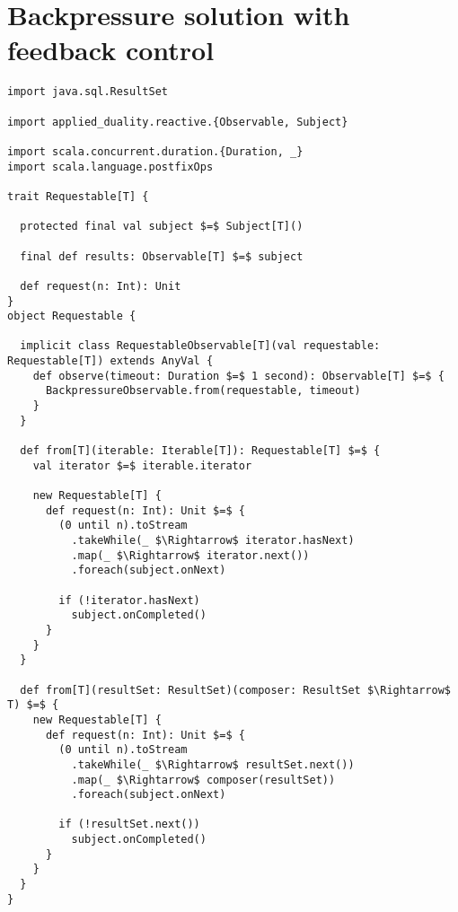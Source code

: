\chapter{Backpressure solution with feedback control}
\label{app:backpressure-solution}

\begin{lstlisting}[style=ScalaStyle, caption={Universal, interactive interface, \code{Requestable}, used in the feedback system}]
import java.sql.ResultSet

import applied_duality.reactive.{Observable, Subject}

import scala.concurrent.duration.{Duration, _}
import scala.language.postfixOps

trait Requestable[T] {

  protected final val subject $=$ Subject[T]()

  final def results: Observable[T] $=$ subject

  def request(n: Int): Unit
}
object Requestable {

  implicit class RequestableObservable[T](val requestable: Requestable[T]) extends AnyVal {
    def observe(timeout: Duration $=$ 1 second): Observable[T] $=$ {
      BackpressureObservable.from(requestable, timeout)
    }
  }

  def from[T](iterable: Iterable[T]): Requestable[T] $=$ {
    val iterator $=$ iterable.iterator

    new Requestable[T] {
      def request(n: Int): Unit $=$ {
        (0 until n).toStream
          .takeWhile(_ $\Rightarrow$ iterator.hasNext)
          .map(_ $\Rightarrow$ iterator.next())
          .foreach(subject.onNext)

        if (!iterator.hasNext)
          subject.onCompleted()
      }
    }
  }

  def from[T](resultSet: ResultSet)(composer: ResultSet $\Rightarrow$ T) $=$ {
    new Requestable[T] {
      def request(n: Int): Unit $=$ {
        (0 until n).toStream
          .takeWhile(_ $\Rightarrow$ resultSet.next())
          .map(_ $\Rightarrow$ composer(resultSet))
          .foreach(subject.onNext)

        if (!resultSet.next())
          subject.onCompleted()
      }
    }
  }
}
\end{lstlisting}
